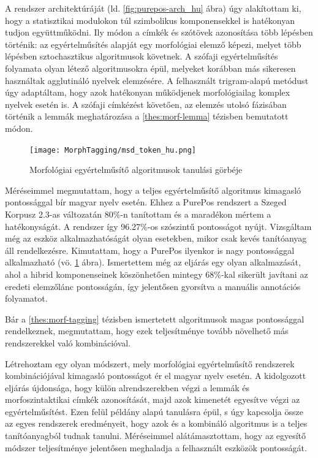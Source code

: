 A rendszer architektúráját  (ld. \ref{fig:purepos-arch_hu} ábra) úgy alakítottam ki, hogy a statisztikai modulokon túl szimbolikus komponensekkel is hatékonyan tudjon együttműködni. 
Ily módon a címkék és szótövek azonosítása több lépésben történik:
az egyértelműsítés alapját egy morfológiai elemző képezi, melyet több lépésben sztochasztikus algoritmusok követnek. 
A szófaji egyértelműsítés folyamata olyan létező algoritmusokra épül, melyeket korábban más sikeresen használtak agglutináló nyelvek elemzésére. 
A felhasznált trigram-alapú metódust úgy adaptáltam, hogy azok hatékonyan működjenek morfológiailag komplex nyelvek esetén is.
A szófaji címkézést követően, az elemzés utolsó fázisában történik a lemmák meghatározása a \ref{thes:morf-lemma} tézisben bemutatott módon.

\begin{figure}[H]
  \centering
  \texttt{[image: MorphTagging/msd\_token\_hu.png]}
  \caption{Morfológiai egyértelműsítő algoritmusok tanulási görbéje}
  \label{fig:humor-token_hu}
\end{figure}


Méréseimmel megmutattam, hogy a teljes egyértelműsítő algoritmus kimagasló pontossággal bír magyar nyelv esetén. 
Ehhez a PurePos rendszert a Szeged Korpusz 2.3-as változatán 80\%-n tanítottam és a maradékon mértem a hatékonyságát. 
A rendszer így 96.27\%-os szószintű pontosságot nyújt.
Vizsgáltam még az eszköz alkalmazhatóságát olyan esetekben, mikor csak kevés tanítóanyag áll rendelkezésre.
Kimutattam, hogy a PurePos ilyenkor is nagy pontossággal alkalmazható (vö. \ref{fig:humor-token_hu} ábra). 
Ismertettem még az eljárás egy olyan alkalmazását, ahol a hibrid komponenseinek köszönhetően mintegy 68\%-kal sikerült javítani az eredeti elemzőlánc pontosságán, így jelentősen gyorsítva a manuális annotációs folyamatot.


\thesisline%


Bár a \ref{thes:morf-tagging} tézisben ismertetett algoritmusok magas pontossággal rendelkeznek, megmutattam, hogy ezek teljesítménye tovább növelhető más rendszerekkel való kombinációval. 

\begin{core}
\begin{thesis}
Létrehoztam egy olyan módszert, mely morfológiai egyértelműsítő rendszerek kombinációjával kimagasló pontosságot ér el magyar nyelv esetén.
A kidolgozott eljárás újdonsága, hogy külön alrendszerekben végzi a lemmák és morfoszintaktikai címkék azonosítását, majd azok kimenetét egyesítve végzi az egyértelműsítést.
Ezen felül példány alapú tanulásra épül, s úgy kapcsolja össze az egyes rendszerek eredményeit, hogy azok és a kombináló algoritmus is a teljes tanítóanyagból tudnak tanulni. 
Méréseimmel alátámasztottam, hogy az egyesítő módszer teljesítménye jelentősen meghaladja a felhasznált eszközök pontosságát. 
\end{thesis}

\begin{pub}
\cite{Laki2013a,Orosz2013c,Orosz2013d} 
\end{pub}
\end{core}


